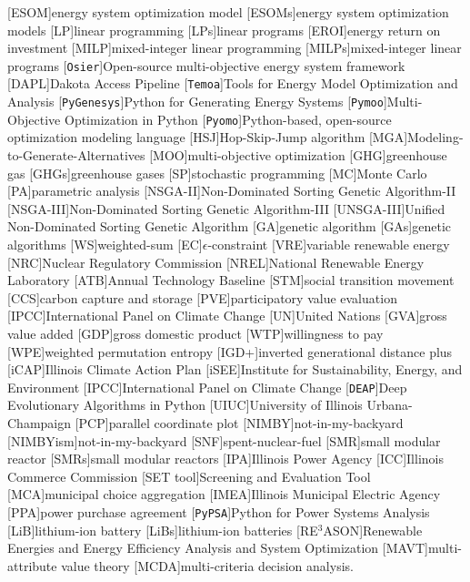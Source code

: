 [ESOM]{energy system optimization model}
[ESOMs]{energy system optimization models}
[LP]{linear programming}
[LPs]{linear programs}
[EROI]{energy return on investment}
[MILP]{mixed-integer linear programming}
[MILPs]{mixed-integer linear programs}
[\texttt{Osier}]{Open-source multi-objective energy system framework}
[DAPL]{Dakota Access Pipeline}
[\texttt{Temoa}]{Tools for Energy Model Optimization and Analysis}
[\texttt{PyGenesys}]{Python for Generating Energy Systems}
[\texttt{Pymoo}]{Multi-Objective Optimization in Python}
[\texttt{Pyomo}]{Python-based, open-source optimization modeling language}
[HSJ]{Hop-Skip-Jump algorithm}
[MGA]{Modeling-to-Generate-Alternatives}
[MOO]{multi-objective optimization}
[GHG]{greenhouse gas}
[GHGs]{greenhouse gases}
[SP]{stochastic programming}
[MC]{Monte Carlo}
[PA]{parametric analysis}
[NSGA-II]{Non-Dominated Sorting Genetic Algorithm-II}
[NSGA-III]{Non-Dominated Sorting Genetic Algorithm-III}
[UNSGA-III]{Unified Non-Dominated Sorting Genetic Algorithm}
[GA]{genetic algorithm}
[GAs]{genetic algorithms}
[WS]{weighted-sum}
[EC]{$\epsilon$-constraint}
[VRE]{variable renewable energy}
[NRC]{Nuclear Regulatory Commission}
[NREL]{National Renewable Energy Laboratory}
[ATB]{Annual Technology Baseline}
[STM]{social transition movement}
[CCS]{carbon capture and storage}
[PVE]{participatory value evaluation}
[IPCC]{International Panel on Climate Change}
[UN]{United Nations}
[GVA]{gross value added}
[GDP]{gross domestic product}
[WTP]{willingness to pay}
[WPE]{weighted permutation entropy}
[IGD+]{inverted generational distance plus}
[iCAP]{Illinois Climate Action Plan}
[iSEE]{Institute for Sustainability, Energy, and Environment}
[IPCC]{International Panel on Climate Change}
[\texttt{DEAP}]{Deep Evolutionary Algorithms in Python}
[UIUC]{University of Illinois Urbana-Champaign}
[PCP]{parallel coordinate plot}
[NIMBY]{not-in-my-backyard}
[NIMBYism]{not-in-my-backyard}
[SNF]{spent-nuclear-fuel}
[SMR]{small modular reactor}
[SMRs]{small modular reactors}
[IPA]{Illinois Power Agency}
[ICC]{Illinois Commerce Commission}
[SET tool]{Screening and Evaluation Tool}
[MCA]{municipal choice aggregation}
[IMEA]{Illinois Municipal Electric Agency}
[PPA]{power purchase agreement}
[\texttt{PyPSA}]{Python for Power Systems Analysis}
[LiB]{lithium-ion battery}
[LiBs]{lithium-ion batteries}
[RE$^3$ASON]{Renewable Energies and Energy Efficiency Analysis and System Optimization}
[MAVT]{multi-attribute value theory}
[MCDA]{multi-criteria decision analysis}.